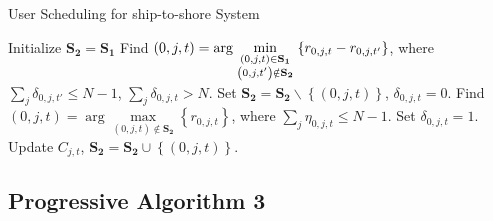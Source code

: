 \documentclass[conference]{IEEEtran}
\begin{document}
\begin{algorithm}[h]
\caption{User Scheduling for ship-to-shore System}
\begin{algorithmic}[1]
\STATE Initialize ${{\mathbf{S}}_{\mathbf{2}}}={{\mathbf{S}}_{\mathbf{1}}}$
  \STATE Find $\left( {0,j,t} \right) = \arg \mathop {\min }\limits_{\scriptstyle \left( {0,j,t} \right) \in {{\mathbf{S}}_{\mathbf{1}}} \atop
  \scriptstyle \left( {0,j,t'} \right) \notin {{\mathbf{S}}_{\mathbf{2}}}}  \left\{ {{r_{0,j,t}} - {r_{0,j,t'}}} \right\}$, where $\sum\limits_{j} {{\delta _{0,j,t'}}}  \le N - 1$, $\sum\limits_j {{\delta _{0,j,t}} > N} $.
  \STATE Set ${{\mathbf{S}}_{\mathbf{2}}}={{\mathbf{S}}_{\mathbf{2}}}\backslash \left\{ {\left( {0,j,t} \right)} \right\}$, ${\delta _{0,j,t}} = 0$.
    \STATE Find ${\left( {0,j,t} \right) = \arg \mathop {\max }\limits_{\left( {0,j,t} \right) \notin {{\mathbf{S}}_{\mathbf{2}}}} \left\{ {{r_{0,j,t}}} \right\}}$, where ${\sum\limits_j {{\eta _{0,j,t}}}  \le N - 1}$.
    \STATE Set ${\delta _{0,j,t}} = 1$.
    \STATE Update ${C_{j,t}}$, ${{\mathbf{S}}_{\mathbf{2}}}={{\mathbf{S}}_{\mathbf{2}}} \cup \left\{ {\left( {0,j,t} \right)} \right\}$.
  \ENDWHILE
\ENDWHILE
\end{algorithmic}
\end{algorithm}

\subsection{Progressive Algorithm 3}
\end{document}
